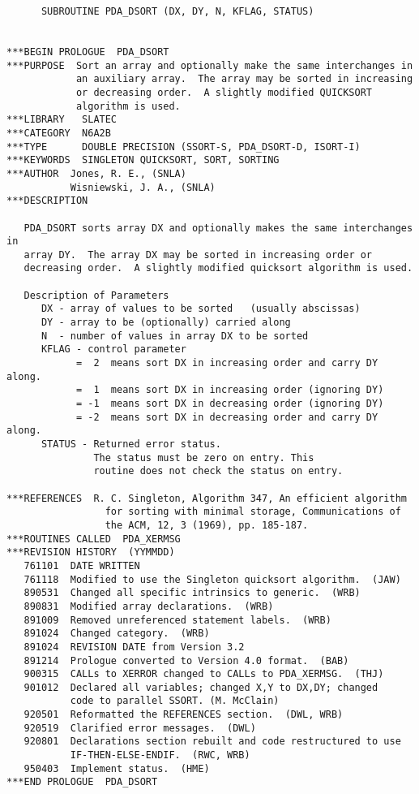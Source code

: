 \begin{verbatim}
      SUBROUTINE PDA_DSORT (DX, DY, N, KFLAG, STATUS)


***BEGIN PROLOGUE  PDA_DSORT
***PURPOSE  Sort an array and optionally make the same interchanges in
            an auxiliary array.  The array may be sorted in increasing
            or decreasing order.  A slightly modified QUICKSORT
            algorithm is used.
***LIBRARY   SLATEC
***CATEGORY  N6A2B
***TYPE      DOUBLE PRECISION (SSORT-S, PDA_DSORT-D, ISORT-I)
***KEYWORDS  SINGLETON QUICKSORT, SORT, SORTING
***AUTHOR  Jones, R. E., (SNLA)
           Wisniewski, J. A., (SNLA)
***DESCRIPTION

   PDA_DSORT sorts array DX and optionally makes the same interchanges in
   array DY.  The array DX may be sorted in increasing order or
   decreasing order.  A slightly modified quicksort algorithm is used.

   Description of Parameters
      DX - array of values to be sorted   (usually abscissas)
      DY - array to be (optionally) carried along
      N  - number of values in array DX to be sorted
      KFLAG - control parameter
            =  2  means sort DX in increasing order and carry DY along.
            =  1  means sort DX in increasing order (ignoring DY)
            = -1  means sort DX in decreasing order (ignoring DY)
            = -2  means sort DX in decreasing order and carry DY along.
      STATUS - Returned error status.
               The status must be zero on entry. This
               routine does not check the status on entry.

***REFERENCES  R. C. Singleton, Algorithm 347, An efficient algorithm
                 for sorting with minimal storage, Communications of
                 the ACM, 12, 3 (1969), pp. 185-187.
***ROUTINES CALLED  PDA_XERMSG
***REVISION HISTORY  (YYMMDD)
   761101  DATE WRITTEN
   761118  Modified to use the Singleton quicksort algorithm.  (JAW)
   890531  Changed all specific intrinsics to generic.  (WRB)
   890831  Modified array declarations.  (WRB)
   891009  Removed unreferenced statement labels.  (WRB)
   891024  Changed category.  (WRB)
   891024  REVISION DATE from Version 3.2
   891214  Prologue converted to Version 4.0 format.  (BAB)
   900315  CALLs to XERROR changed to CALLs to PDA_XERMSG.  (THJ)
   901012  Declared all variables; changed X,Y to DX,DY; changed
           code to parallel SSORT. (M. McClain)
   920501  Reformatted the REFERENCES section.  (DWL, WRB)
   920519  Clarified error messages.  (DWL)
   920801  Declarations section rebuilt and code restructured to use
           IF-THEN-ELSE-ENDIF.  (RWC, WRB)
   950403  Implement status.  (HME)
***END PROLOGUE  PDA_DSORT
\end{verbatim}

